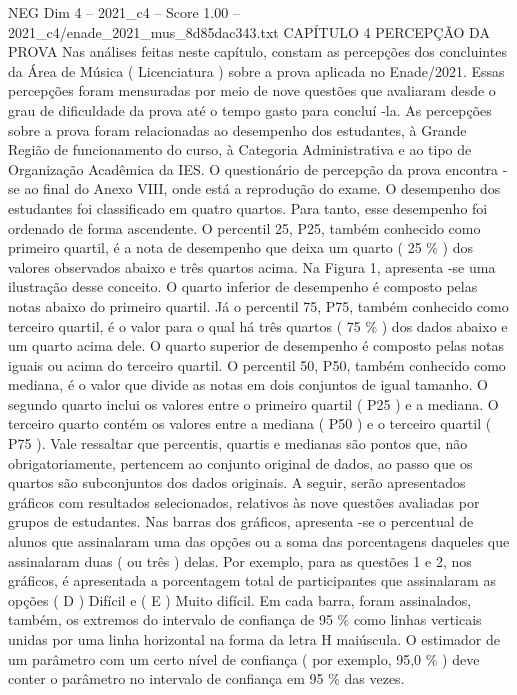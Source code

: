 \begin{textsample}{NEG Dim 4 – 2021\_c4 – Score 1.00 – 2021\_c4/enade\_2021\_mus\_8d85dac343.txt}  \label{ex:f4_neg_219}
CAPÍTULO 4 PERCEPÇÃO DA PROVA Nas análises feitas neste capítulo, constam as percepções dos concluintes da Área de Música ( Licenciatura ) sobre a prova aplicada no Enade/2021.
Essas percepções foram mensuradas por meio de nove questões que avaliaram desde o grau de dificuldade da prova até o tempo gasto para concluí -la.
As percepções sobre a prova foram relacionadas ao desempenho dos estudantes, à Grande Região de funcionamento do curso, à Categoria Administrativa e ao tipo de Organização Acadêmica da IES.
O questionário de percepção da prova encontra -se ao final do Anexo VIII, onde está a reprodução do exame.
O desempenho dos estudantes foi classificado em quatro quartos.
Para tanto, esse desempenho foi ordenado de forma ascendente.
O percentil 25, P25, também conhecido como primeiro quartil, é a nota de desempenho que deixa um quarto ( 25 \% ) dos valores observados abaixo e três quartos acima.
Na Figura 1, apresenta -se uma ilustração desse conceito.
O quarto inferior de desempenho é composto pelas notas abaixo do primeiro quartil.
Já o percentil 75, P75, também conhecido como terceiro quartil, é o valor para o qual há três quartos ( 75 \% ) dos dados abaixo e um quarto acima dele.
O quarto superior de desempenho é composto pelas notas iguais ou acima do terceiro quartil.
O percentil 50, P50, também conhecido como mediana, é o valor que divide as notas em dois conjuntos de igual tamanho.
O segundo quarto inclui os valores entre o primeiro quartil ( P25 ) e a mediana.
O terceiro quarto contém os valores entre a mediana ( P50 ) e o terceiro quartil ( P75 ).
Vale ressaltar que percentis, quartis e medianas são pontos que, não obrigatoriamente, pertencem ao conjunto original de dados, ao passo que os quartos são subconjuntos dos dados originais.
A seguir, serão apresentados gráficos com resultados selecionados, relativos às nove questões avaliadas por grupos de estudantes.
Nas barras dos gráficos, apresenta -se o percentual de alunos que assinalaram uma das opções ou a soma das porcentagens daqueles que assinalaram duas ( ou três ) delas.
Por exemplo, para as questões 1 e 2, nos gráficos, é apresentada a porcentagem total de participantes que assinalaram as opções ( D ) Difícil e ( E ) Muito difícil.
Em cada barra, foram assinalados, também, os extremos do intervalo de confiança de 95 \% como linhas verticais unidas por uma linha horizontal na forma da letra H maiúscula.
O estimador de um parâmetro com um certo nível de confiança ( por exemplo, 95,0 \% ) deve conter o parâmetro no intervalo de confiança em 95 \% das vezes.

\end{textsample}
